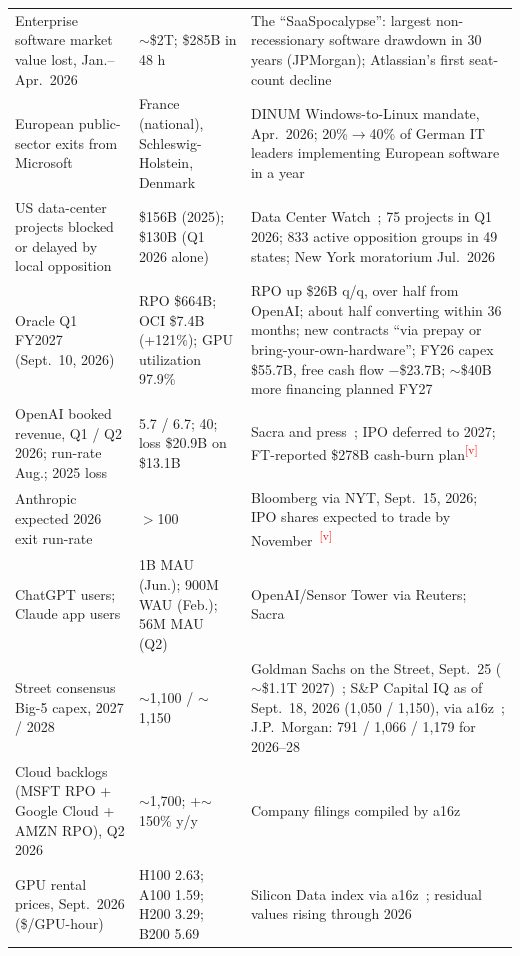\documentclass[11pt,letterpaper]{article}
\newcommand{\verify}{\textsuperscript{\textcolor{red}{[v]}}}
\begin{document}
\begin{xltabular}{\textwidth}{L{4.3cm}L{2.7cm}X}
Enterprise software market value lost, Jan.--Apr.~2026 & $\sim$\$2T; \$285B in 48 h & The ``SaaSpocalypse'': largest non-recessionary software drawdown in 30 years (JPMorgan); Atlassian's first seat-count decline~\cite{ref:saaspocalypse_ti,ref:saaspocalypse_fc} \\
European public-sector exits from Microsoft & France (national), Schleswig-Holstein, Denmark & DINUM Windows-to-Linux mandate, Apr.~2026; 20\%$\to$40\% of German IT leaders implementing European software in a year~\cite{ref:eu_sovereignty,ref:tuta_sovereignty} \\
US data-center projects blocked or delayed by local opposition & \$156B (2025); \$130B (Q1 2026 alone) & Data Center Watch~\cite{ref:dcw_q1_2026}; 75 projects in Q1 2026; 833 active opposition groups in 49 states; New York moratorium Jul.~2026~\cite{ref:tomshw_dcw} \\
Oracle Q1 FY2027 (Sept.~10, 2026) & RPO \$664B; OCI \$7.4B (+121\%); GPU utilization 97.9\% & RPO up \$26B q/q, over half from OpenAI; about half converting within 36 months; new contracts ``via prepay or bring-your-own-hardware''; FY26 capex \$55.7B, free cash flow $-$\$23.7B; $\sim$\$40B more financing planned FY27~\cite{ref:orcl_q1fy27,ref:orcl_q1fy27_mw} \\
OpenAI booked revenue, Q1 / Q2 2026; run-rate Aug.; 2025 loss & 5.7 / 6.7; 40; loss \$20.9B on \$13.1B & Sacra and press~\cite{ref:sacra_openai,ref:valueadd_openai}; IPO deferred to 2027; FT-reported \$278B cash-burn plan\verify \\
Anthropic expected 2026 exit run-rate & $>$100 & Bloomberg via NYT, Sept.~15, 2026; IPO shares expected to trade by November~\cite{ref:valueadd_openai}\verify \\
ChatGPT users; Claude app users & 1B MAU (Jun.); 900M WAU (Feb.); 56M MAU (Q2) & OpenAI/Sensor Tower via Reuters; Sacra~\cite{ref:sacra_openai,ref:aibw_openai} \\
Street consensus Big-5 capex, 2027 / 2028 & $\sim$1,100 / $\sim$1,150 & Goldman Sachs on the Street, Sept.~25 ($\sim$\$1.1T 2027)~\cite{ref:gs_capex_bbg}; S\&P Capital IQ as of Sept.~18, 2026 (1,050 / 1,150), via a16z~\cite{ref:a16z_som}; J.P.~Morgan: 791 / 1,066 / 1,179 for 2026--28~\cite{ref:jpmam_gtm} \\
Cloud backlogs (MSFT RPO + Google Cloud + AMZN RPO), Q2 2026 & $\sim$1,700; +$\sim$150\% y/y & Company filings compiled by a16z~\cite{ref:a16z_som} \\
GPU rental prices, Sept.~2026 (\$/GPU-hour) & H100 2.63; A100 1.59; H200 3.29; B200 5.69 & Silicon Data index via a16z~\cite{ref:silicon_data,ref:a16z_som}; residual values rising through 2026 \\

\end{xltabular}
\end{document}
